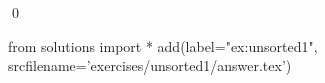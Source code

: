 
\begin{ex} 
  \label{ex:unsorted1}
  
  \qed
\end{ex} 
\begin{python0}
from solutions import *
add(label="ex:unsorted1",
    srcfilename='exercises/unsorted1/answer.tex') 
\end{python0}
